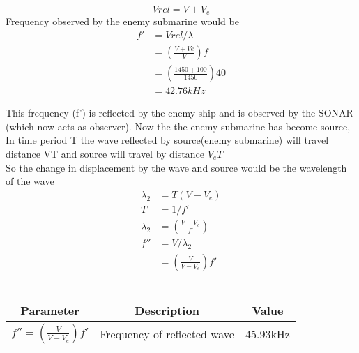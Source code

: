 \documentclass[journal,12pt,twocolumn]{IEEEtran}
\theoremstyle{remark}
\begin{document}
\begin{equation}
Vrel=V+V_e
\end{equation}
Frequency observed by the enemy submarine would be
\begin{align}
f'&=Vrel/\lambda\\
&=(\frac{V+Ve}{V})f\\
&= (\frac{1450+100}{1450})40\\
&=42.76kHz
\end{align}

This frequency (f') is reflected by the enemy ship and is observed by the SONAR (which now acts as observer).
Now the the enemy submarine has become source,\\
In time period T the wave reflected by source(enemy submarine) will travel distance VT and source will travel by distance $V_eT$\\
So the change in displacement by the wave and source would be the wavelength of the wave
\begin{align}
\lambda_2&=T(V-V_e)\\
T&=1/f'\\
\lambda_2&=(\frac{V-V_e}{f'})\\
f''&=V/\lambda_2\\
&=(\frac{V}{V-V_e})f'
\end{align}
\\
\begin{tabular}{|c|c|c|}
   \hline
   Parameter & Description & Value\\
   \hline
   $f''= (\frac{V}{V-V_e})f'$& Frequency of reflected wave & 45.93kHz\\
   \hline
   
\end{tabular}
\end{document}
